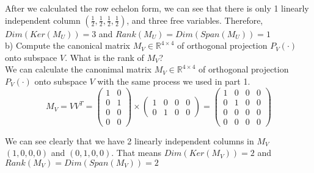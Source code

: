 \documentclass[12pt,twoside]{article}
\begin{document}
After we calculated the row echelon form, we can see that there is only 1 linearly independent column $(\frac{1}{2},\frac{1}{2},\frac{1}{2},\frac{1}{2})$, and three free variables. Therefore, $Dim(Ker(M_U)) = 3$ and $Rank(M_U) = Dim(Span(M_U)) = 1$
\\

b) Compute the canonical matrix $M_V \in \mathbb{R}^{4\times 4}$ of orthogonal projection $P_V(\cdot)$ onto subspace $V$. What is the rank of $M_V$?
\\

We can calculate the canonimal matrix $M_V \in \mathbb{R}^{4\times 4}$ of orthogonal projection $P_V(\cdot)$ onto subspace $V$ with the same process we used in part 1.
$$
    M_V = VV^T = \begin{pmatrix} 
    1 & 0 \\
    0 & 1 \\
    0 & 0 \\
    0 & 0 
    \end{pmatrix} \times
    \begin{pmatrix}
    1 & 0 & 0 & 0 \\
    0 & 1 & 0 & 0 
    \end{pmatrix} = 
    \begin{pmatrix}
    1 & 0 & 0 & 0\\
    0 & 1 & 0 & 0\\
    0 & 0 & 0 & 0\\
    0 & 0 & 0 & 0
    \end{pmatrix}
$$

We can see clearly that we have 2 linearly independent columns in $M_V$ $(1,0,0,0)$ and $(0,1,0,0)$. That means $Dim(Ker(M_V)) = 2$ and $Rank(M_V) = Dim(Span(M_V)) = 2$ \\
\end{document}
